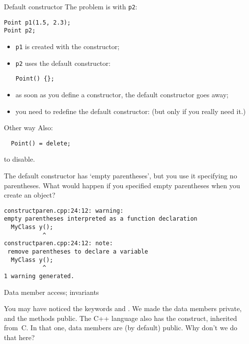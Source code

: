 \begin{slide}{Default constructor}
  \label{sl:obj-def-construct2}
  The problem is with \lstinline{p2}:
\begin{lstlisting}
Point p1(1.5, 2.3);
Point p2;
\end{lstlisting}
\begin{itemize}
\item \lstinline{p1} is created with the constructor;
\item \lstinline{p2} uses the default constructor:
\begin{lstlisting}
Point() {};
\end{lstlisting}
\item as soon as you define a constructor, the default constructor
  goes away;
\item you need to redefine the default constructor:
  (but only if you really need it.)
\end{itemize}
\end{slide}

\begin{slide}{Other way}
  \label{sl:obj-def-construct2a}
Also:
\begin{lstlisting}
  Point() = delete;
\end{lstlisting}
to disable.
\end{slide}

\begin{remark}
  The default constructor has `empty parentheses', but you use
  it specifying no parentheses.
  What would happen if you specified empty parentheses when you create an object?
  

\begin{verbatim}
constructparen.cpp:24:12: warning: 
empty parentheses interpreted as a function declaration
  MyClass y();
           ^
constructparen.cpp:24:12: note:
 remove parentheses to declare a variable
  MyClass y();
           ^
1 warning generated.  
\end{verbatim}
\end{remark}

 {Data member access; invariants}

You may have noticed the keywords  and
. We made the data members private, and the
methods public.
The C++ language also has the  construct,
inherited from~C.
In that one, data members are (by default) public. Why don't we do that here?


